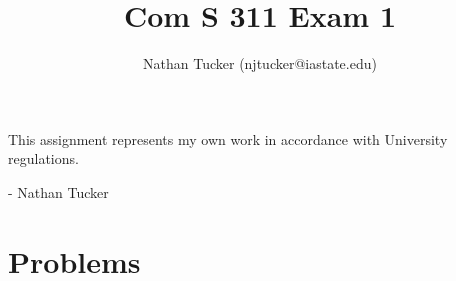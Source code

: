 \documentclass[11pt]{amsart}
\begin{document}


\title{Com S 311 Exam 1}
\author{Nathan Tucker (njtucker@iastate.edu)}
\maketitle

\doublespacing

\vspace{10mm}

\vfill
\begin{flushright}
This assignment represents my own work in accordance with University regulations.

- Nathan Tucker
\end{flushright}

\newpage

\section*{Problems}
\end{document}
